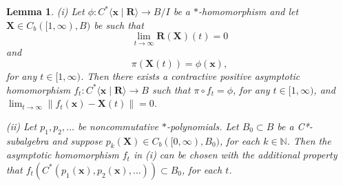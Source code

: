 \documentclass{article}%
\newtheorem{lemma}[theorem]{Lemma}
\begin{document}
\begin{lemma}\label{ExtendingFromGenerators} (i) Let $\phi: C^*\langle \mathbf x\;|\;\mathbf R\rangle \to B/I$ be a $\ast$-homomorphism and let $\mathbf X \in C_b([1, \infty), B)$  be such that
\begin{equation}\label{ExtendingFromGenerators1} \lim_{t\to\infty} \mathbf R(\mathbf X)(t) = 0\end{equation}
and
\begin{equation}\label{ExtendingFromGenerators1'} \pi(\mathbf X(t)) = \phi(\mathbf x), \end{equation}
for any $t\in [1,\infty)$.
Then there exists a contractive positive asymptotic homomorphism $f_t: C^*\langle \mathbf x\;|\;\mathbf R\rangle\to B$ such that $\pi\circ f_t = \phi$, for any $t\in [1,\infty)$, and $\lim_{t\to \infty} \|f_t(\mathbf x) - \mathbf X(t)\| = 0$.


\medskip

(ii) Let $p_1, p_2, \ldots$ be noncommutative $\ast$-polynomials.
 Let $B_0\subset B$ be a C*-subalgebra and suppose
$p_k(\mathbf X)\in C_b([0, \infty), B_0)$, for each $k\in \mathbb N$. Then the asymptotic homomorphism $f_t$ in (i) can be chosen with the additional property that $f_t(C^*(p_1(\mathbf x), p_2(\mathbf x), \ldots))\subset B_0$, for each $t$.
\end{lemma}
\end{document}
